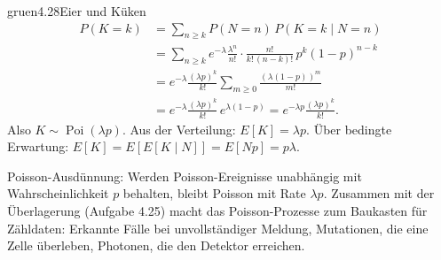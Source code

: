 \begin{loesungkarte}{gruen}{4.28}{Eier und Küken}
\begin{align*}
P(K = k) &= \sum_{n\ge k}P(N = n)\,P(K = k\mid N = n)\\
&= \sum_{n\ge k}e^{-\lambda}\frac{\lambda^{n}}{n!}\cdot\frac{n!}{k!\,(n - k)!}\,p^{k}(1 - p)^{n-k}\\
&= e^{-\lambda}\frac{(\lambda p)^{k}}{k!}\sum_{m\ge0}\frac{(\lambda(1 - p))^{m}}{m!}\\
&= e^{-\lambda}\frac{(\lambda p)^{k}}{k!}\,e^{\lambda(1 - p)} = e^{-\lambda p}\frac{(\lambda p)^{k}}{k!}.
\end{align*}
Also $K\sim\operatorname{Poi}(\lambda p)$.
Aus der Verteilung: $E[K] = \lambda p$. Über bedingte Erwartung: $E[K] = E[E[K\mid N]] = E[Np] = p\lambda$. \checkmark
{}
\begin{mitnehmen}\kastentext
Poisson-Ausdünnung: Werden Poisson-Ereignisse unabhängig mit Wahrscheinlichkeit $p$ behalten, bleibt Poisson mit Rate $\lambda p$. Zusammen mit der Überlagerung (Aufgabe 4.25) macht das Poisson-Prozesse zum Baukasten für Zähldaten: Erkannte Fälle bei unvollständiger Meldung, Mutationen, die eine Zelle überleben, Photonen, die den Detektor erreichen.
\end{mitnehmen}
\end{loesungkarte}

